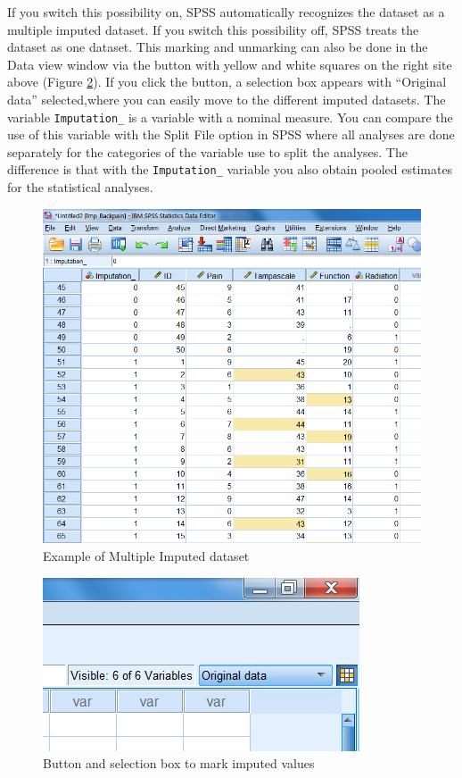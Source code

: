 \documentclass[]{book}
\theoremstyle{definition}
\theoremstyle{definition}
\theoremstyle{definition}
\theoremstyle{remark}
\begin{document}
If you switch this possibility on, SPSS automatically recognizes the
dataset as a multiple imputed dataset. If you switch this possibility
off, SPSS treats the dataset as one dataset. This marking and unmarking
can also be done in the Data view window via the button with yellow and
white squares on the right site above (Figure \ref{fig:fig4-11}). If you
click the button, a selection box appears with ``Original data''
selected,where you can easily move to the different imputed datasets.
The variable \texttt{Imputation\_} is a variable with a nominal measure.
You can compare the use of this variable with the Split File option in
SPSS where all analyses are done separately for the categories of the
variable use to split the analyses. The difference is that with the
\texttt{Imputation\_} variable you also obtain pooled estimates for the
statistical analyses.

\begin{figure}

{\centering \includegraphics[width=0.9\linewidth]{images/fig4.10} 

}

\caption{Example of Multiple Imputed dataset}\label{fig:fig4-10}
\end{figure}

\begin{figure}

{\centering \includegraphics[width=0.9\linewidth]{images/fig4.11} 

}

\caption{Button and selection box to mark imputed values}\label{fig:fig4-11}
\end{figure}
\end{document}
